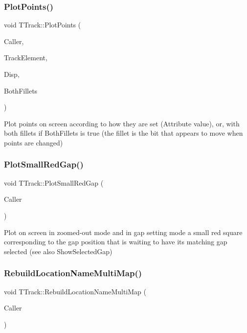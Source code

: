 \subsubsection{\texorpdfstring{Plot\+Points()}{PlotPoints()}}
{\footnotesize\ttfamily void T\+Track\+::\+Plot\+Points (\begin{DoxyParamCaption}\item[{int}]{Caller,  }\item[{\mbox{\hyperlink{class_t_track_element}{T\+Track\+Element}}}]{Track\+Element,  }\item[{\mbox{\hyperlink{class_t_display}{T\+Display}} $\ast$}]{Disp,  }\item[{bool}]{Both\+Fillets }\end{DoxyParamCaption})}

Plot points on screen according to how they are set (Attribute value), or, with both fillets if Both\+Fillets is true (the fillet is the bit that appears to move when points are changed) \mbox{\label{class_t_track_ab831c2f47850f3a89678491475d52d29}} 
\subsubsection{\texorpdfstring{Plot\+Small\+Red\+Gap()}{PlotSmallRedGap()}}
{\footnotesize\ttfamily void T\+Track\+::\+Plot\+Small\+Red\+Gap (\begin{DoxyParamCaption}\item[{int}]{Caller }\end{DoxyParamCaption})}

Plot on screen in zoomed-\/out mode and in gap setting mode a small red square corresponding to the gap position that is waiting to have its matching gap selected (see also Show\+Selected\+Gap) \mbox{\label{class_t_track_a4a948544c9ac877232ec721db8bfc914}} 
\subsubsection{\texorpdfstring{Rebuild\+Location\+Name\+Multi\+Map()}{RebuildLocationNameMultiMap()}}
{\footnotesize\ttfamily void T\+Track\+::\+Rebuild\+Location\+Name\+Multi\+Map (\begin{DoxyParamCaption}\item[{int}]{Caller }\end{DoxyParamCaption})}

